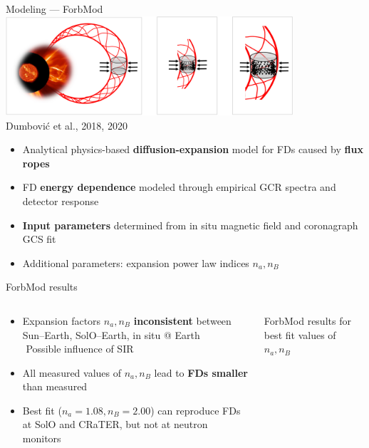 \documentclass[10pt,aspectratio=169,usenames,dvipsnames]{beamer}
\newcommand{\textarrow}{\,{\small\faLongArrowAltRight}\,}
\begin{document}
\begin{frame}{Modeling --- ForbMod}
	\centering\includegraphics[width=0.8\textwidth]{images/forbmod_schematic.jpg}\\[-3mm]
	{\footnotesize\flushright Dumbović et al., 2018, 2020}
	
	\begin{itemize}
		\item Analytical physics-based \textbf{diffusion-expansion} model for FDs caused by \textbf{flux ropes}
		\item FD \textbf{energy dependence} modeled through empirical GCR spectra and detector response
		\item \textbf{Input parameters} determined from in situ magnetic field and coronagraph GCS fit
		\item Additional parameters: expansion power law indices $n_a, n_B$ 
	\end{itemize}
\end{frame}

\begin{frame}{ForbMod results}
	\begin{columns}
		\begin{column}{0.4\textwidth}
			\begin{itemize}
				\item Expansion factors $n_a, n_B$ \textbf{inconsistent} between Sun--Earth, SolO--Earth, in situ @ Earth\\
				\small \textarrow Possible influence of SIR
				\item All measured values of $n_a, n_B$ lead to \textbf{FDs smaller} than measured
				\item Best fit ($n_a = 1.08, n_B = 2.00$) can reproduce FDs at SolO and CRaTER, but not at neutron monitors
			\end{itemize}
		\end{column}
		\begin{column}{0.55\textwidth}
			\centering
			\scalebox{0.5}{}
			\footnotesize ForbMod results for best fit values of $n_a, n_B$
		\end{column}
	\end{columns}
\end{frame}
\end{document}
